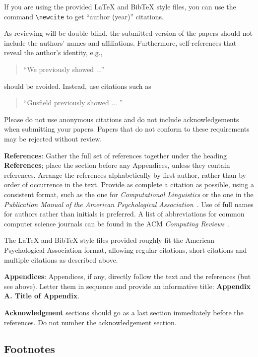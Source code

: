 \documentclass[11pt]{article}
\begin{document}
If you are using the provided \LaTeX{} and Bib\TeX{} style files, you
can use the command \verb|\newcite| to get ``author (year)'' citations.

As reviewing will be double-blind, the submitted version of the papers should not include the
authors' names and affiliations. Furthermore, self-references that
reveal the author's identity, e.g.,
\begin{quote}
``We previously showed \cite{Gusfield:97} ...''
\end{quote}
should be avoided. Instead, use citations such as
\begin{quote}
``Gusfield 
previously showed ... ''
\end{quote}

Please do not  use anonymous
citations and  do not include acknowledgements when submitting your papers. Papers that do not conform
to these requirements may be rejected without review.

\textbf{References}: Gather the full set of references together under
the heading {\bf References}; place the section before any Appendices,
unless they contain references. Arrange the references alphabetically
by first author, rather than by order of occurrence in the text.
Provide as complete a citation as possible, using a consistent format,
such as the one for {\em Computational Linguistics\/} or the one in the
{\em Publication Manual of the American
Psychological Association\/}~\cite{APA:83}.  Use of full names for
authors rather than initials is preferred.  A list of abbreviations
for common computer science journals can be found in the ACM
{\em Computing Reviews\/}~\cite{ACM:83}.

The \LaTeX{} and Bib\TeX{} style files provided roughly fit the
American Psychological Association format, allowing regular citations,
short citations and multiple citations as described above.

{\bf Appendices}: Appendices, if any, directly follow the text and the
references (but see above).  Letter them in sequence and provide an
informative title: {\bf Appendix A. Title of Appendix}.

\textbf{Acknowledgment} sections should go as a last section immediately
before the references. Do not number the acknowledgement section.

\subsection{Footnotes}
\end{document}
